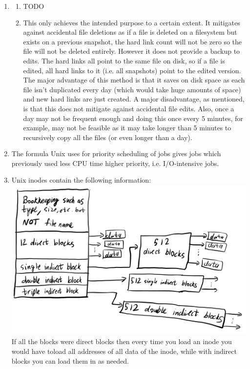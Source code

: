 \documentclass[12pt]{article}
\begin{document}
\begin{enumerate}
\begin{enumerate}
    \end{enumerate}
    \item \begin{enumerate}
        \item TODO
        \item This only achieves the intended purpose to a certain extent. It mitigates against accidental file deletions as if a file is deleted on a filesystem but exists on a previous snapshot, the hard link count will not be zero so the file will not be deleted entirely. However it does not provide a backup to edits. The hard links all point to the same file on disk, so if a file is edited, all hard links to it (i.e. all snapshots) point to the edited version. The major advantage of this method is that it saves on disk space as each file isn't duplicated every day (which would take huge amounts of space) and new hard links are just created. A major disadvantage, as mentioned, is that this does not mitigate against accidental file edits. Also, once a day may not be frequent enough and doing this once every 5 minutes, for example, may not be feasible as it may take longer than 5 minutes to recursively copy all the files (or even longer than a day).
    \end{enumerate}
    \item The formula Unix uses for priority scheduling of jobs gives jobs which previously used less CPU time higher priority, i.e. I/O-intensive jobs.
    \item Unix inodes contain the following information:\\
    \includegraphics[scale=0.25]{2b.jpg}\\
    If all the blocks were direct blocks then every time you load an inode you would have toload all addresses of all data of the inode, while with indirect blocks you can load them in as needed.

\end{enumerate}
\end{document}
